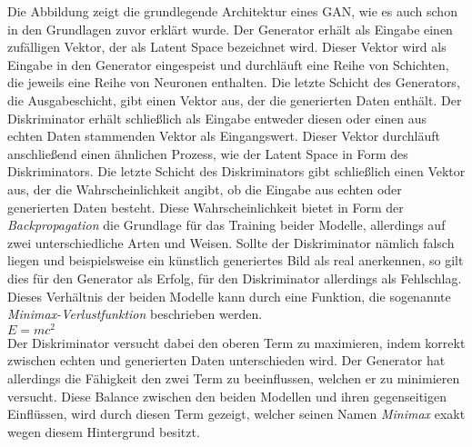     \noindent Die Abbildung zeigt die grundlegende Architektur eines \ac{GAN}, wie es auch schon in den Grundlagen zuvor erklärt wurde. Der Generator erhält als Eingabe einen zufälligen Vektor, der als Latent Space bezeichnet wird. Dieser Vektor wird als Eingabe in den Generator eingespeist und durchläuft eine Reihe von Schichten, die jeweils eine Reihe von Neuronen enthalten. Die letzte Schicht des Generators, die Ausgabeschicht, gibt einen Vektor aus, der die generierten Daten enthält. Der Diskriminator erhält schließlich als Eingabe entweder diesen oder einen aus echten Daten stammenden Vektor als Eingangswert. Dieser Vektor durchläuft anschließend einen ähnlichen Prozess, wie der Latent Space in Form des Diskriminators. Die letzte Schicht des Diskriminators gibt schließlich einen Vektor aus, der die Wahrscheinlichkeit angibt, ob die Eingabe aus echten oder generierten Daten besteht. Diese Wahrscheinlichkeit bietet in Form der \textit{Backpropagation} die Grundlage für das Training beider Modelle, allerdings auf zwei unterschiedliche Arten und Weisen. Sollte der Diskriminator nämlich falsch liegen und beispielsweise ein künstlich generiertes Bild als real anerkennen, so gilt dies für den Generator als Erfolg, für den Diskriminator allerdings als Fehlschlag. Dieses Verhältnis der beiden Modelle kann durch eine Funktion, die sogenannte \textit{Minimax-Verlustfunktion} beschrieben werden.\\

    \(E=mc^2\) \\

    \noindent Der Diskriminator versucht dabei den oberen Term zu maximieren, indem korrekt zwischen echten und generierten Daten unterschieden wird. Der Generator hat allerdings die Fähigkeit den zwei Term zu beeinflussen, welchen er zu minimieren versucht. Diese Balance zwischen den beiden Modellen und ihren gegenseitigen Einflüssen, wird durch diesen Term gezeigt, welcher seinen Namen \textit{Minimax} exakt wegen diesem Hintergrund besitzt. 

    
    

\newpage